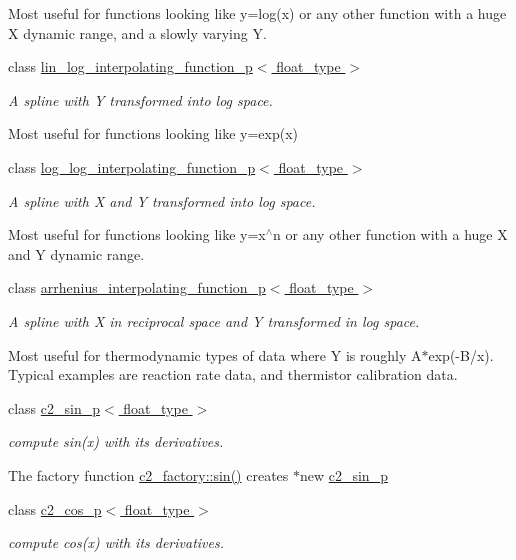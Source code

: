 \begin{DoxyCompactItemize}
\begin{DoxyCompactList}
Most useful for functions looking like y=log(x) or any other function with a huge X dynamic range, and a slowly varying Y. \end{DoxyCompactList}\item 
class \hyperlink{classlin__log__interpolating__function__p}{lin\+\_\+log\+\_\+interpolating\+\_\+function\+\_\+p$<$ float\+\_\+type $>$}
\begin{DoxyCompactList}\small\item\em A spline with Y transformed into log space.

Most useful for functions looking like y=exp(x) \end{DoxyCompactList}\item 
class \hyperlink{classlog__log__interpolating__function__p}{log\+\_\+log\+\_\+interpolating\+\_\+function\+\_\+p$<$ float\+\_\+type $>$}
\begin{DoxyCompactList}\small\item\em A spline with X and Y transformed into log space.

Most useful for functions looking like y=x$^\wedge$n or any other function with a huge X and Y dynamic range. \end{DoxyCompactList}\item 
class \hyperlink{classarrhenius__interpolating__function__p}{arrhenius\+\_\+interpolating\+\_\+function\+\_\+p$<$ float\+\_\+type $>$}
\begin{DoxyCompactList}\small\item\em A spline with X in reciprocal space and Y transformed in log space.

Most useful for thermodynamic types of data where Y is roughly A$\ast$exp(-\/\+B/x). Typical examples are reaction rate data, and thermistor calibration data. \end{DoxyCompactList}\item 
class \hyperlink{classc2__sin__p}{c2\+\_\+sin\+\_\+p$<$ float\+\_\+type $>$}
\begin{DoxyCompactList}\small\item\em compute sin(x) with its derivatives.

The factory function \hyperlink{classc2__factory_a866854d4fdd6c6678512151dbcd635a5}{c2\+\_\+factory\+::sin()} creates $\ast$new \hyperlink{classc2__sin__p}{c2\+\_\+sin\+\_\+p} \end{DoxyCompactList}\item 
class \hyperlink{classc2__cos__p}{c2\+\_\+cos\+\_\+p$<$ float\+\_\+type $>$}
\begin{DoxyCompactList}\small\item\em compute cos(x) with its derivatives.


\end{DoxyCompactList}
\end{DoxyCompactItemize}
